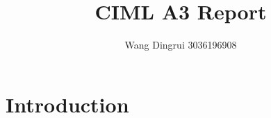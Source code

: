 \documentclass{article}
\title{CIML A3 Report}
\author{Wang Dingrui 3036196908}
\begin{document}
\maketitle

\section{Introduction}
\end{document}
